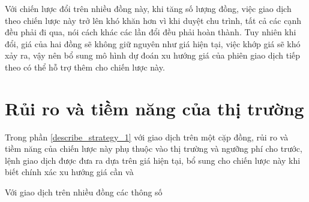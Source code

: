   Với chiến lược đổi trên nhiều đồng này, khi tăng số lượng đồng, việc giao dịch theo chiến lược này trở lên khó khăn hơn vì khi duyệt chu trình, tất cả các cạnh đều phải đi qua, nói cách khác các lần đổi đều phải hoàn thành. Tuy nhiên khi đổi, giá của hai đồng sẽ không giữ nguyên như giá hiện tại, việc khớp giá sẽ khó xảy ra, vậy nên bổ sung mô hình dự đoán xu hướng giá của phiên giao dịch tiếp theo có thể hỗ trợ thêm cho chiến lược này.
  
  \section{Rủi ro và tiềm năng của thị trường}
  
  Trong phần \ref{describe_strategy_1} với giao dịch trên một cặp đồng, rủi ro và tiềm năng của chiến lược này phụ thuộc vào thị trường và ngưỡng phí cho trước, lệnh giao dịch được đưa ra dựa trên giá hiện tại, bổ sung cho chiến lược này khi biết chính xác xu hướng giá cần và
  

Với giao dịch trên nhiều đồng các thông số


